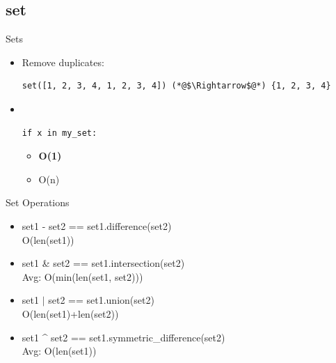 \documentclass[11pt]{beamer}
\begin{document}
\subsection{set}
\begin{frame}[fragile]{Sets}
    \begin{itemize}
        \item<1-> Remove duplicates:
        \begin{lstlisting}
set([1, 2, 3, 4, 1, 2, 3, 4]) (*@$\Rightarrow$@*) {1, 2, 3, 4}
        \end{lstlisting}

        \item<2-> $ $ \\
        \begin{lstlisting}
if x in my_set:
        \end{lstlisting}
        \begin{itemize}
            \item<2->[Avg:] \textbf{O(1)}
            \item<2->[Worst:] O(n)
        \end{itemize}
    \end{itemize}
\end{frame}

\begin{frame}[fragile]{Set Operations}
    \begin{itemize}
        \item set1 - set2 == set1.difference(set2) \\ O(len(set1))
        \pause

        \item set1 \& set2 == set1.intersection(set2) \\ Avg: O(min(len(set1, set2)))
        \pause

        \item set1 $|$ set2  == set1.union(set2) \\ O(len(set1)+len(set2))
        \pause

        \item set1 \^{} set2 == set1.symmetric\_difference(set2) \\ Avg: O(len(set1))
    \end{itemize}
\end{frame}
\end{document}
